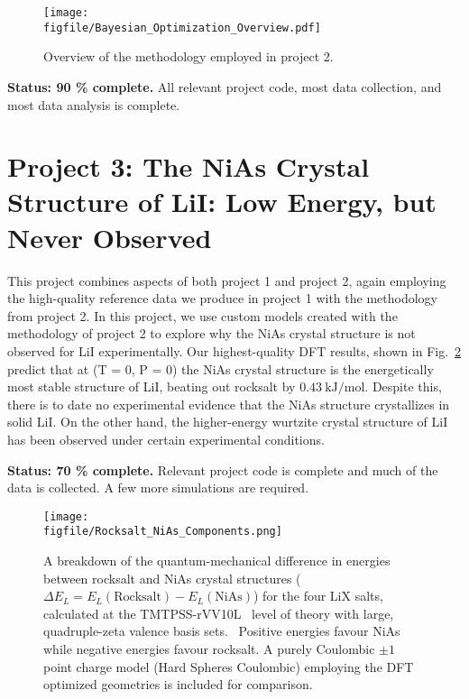 \documentclass[titlepage,11pt]{article}
\newcommand{\figfile}{./figures}
\begin{document}
\begin{figure}
	\texttt{[image: \\figfile/Bayesian\_Optimization\_Overview.pdf]}
	\caption{\label{fig:BO_Overview} Overview of the methodology employed in project 2.}
\end{figure}

\textbf{Status: 90 \% complete.} All relevant project code, most data collection, and most data analysis is complete.


\section{Project 3: The NiAs Crystal Structure of LiI: Low Energy, but Never Observed}

This project combines aspects of both project 1 and project 2, again employing the high-quality reference data we produce in project 1 with the methodology from project 2. In this project, we use custom models created with the methodology of project 2 to explore why the NiAs crystal structure is not observed for LiI experimentally. Our highest-quality DFT results, shown in Fig.~\ref{fig:RS_NiAs_Compare} predict that at (T = 0, P = 0) the NiAs crystal structure is the energetically most stable structure of LiI, beating out rocksalt by $\SI{0.43}{\kilo\joule\per\mole}$. Despite this, there is to date no experimental evidence that the NiAs structure crystallizes in solid LiI. On the other hand, the higher-energy wurtzite crystal structure of LiI has been observed under certain experimental conditions.~\cite{vcanvcarevic2005theoretical}


\textbf{Status: 70 \% complete.} Relevant project code is complete and much of the data is collected. A few more simulations are required.


\begin{figure}
	\texttt{[image: \\figfile/Rocksalt\_NiAs\_Components.png]}
	\caption{\label{fig:RS_NiAs_Compare} A breakdown of the quantum-mechanical difference in energies between rocksalt and NiAs crystal structures ($\Delta E_{L} = E_{L}(\text{Rocksalt}) - E_{L}(\text{NiAs})$) for the four LiX salts, calculated at the TMTPSS-rVV10L~\cite{tao2016accurate,patra2019performance} level of theory with large, quadruple-zeta valence basis sets.~\cite{scheiber2021analysis} Positive energies favour NiAs while negative energies favour rocksalt. A purely Coulombic $\pm 1$ point charge model (Hard Spheres Coulombic) employing the DFT optimized geometries is included for comparison.}
\end{figure}
\end{document}
